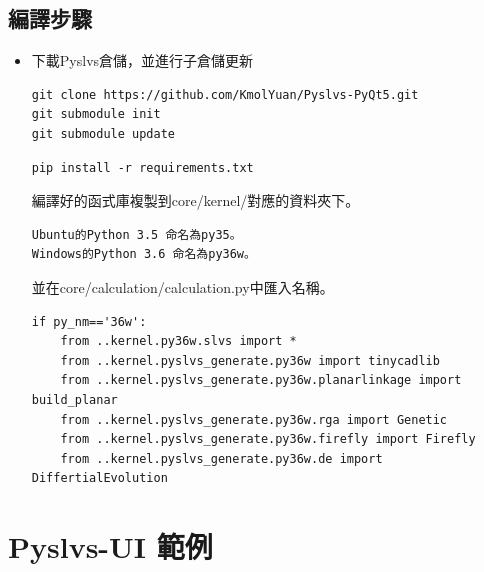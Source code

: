 \documentclass[14pt,a4paper]{report}  %
\begin{document}
{     \subsection{編譯步驟}
		\begin{itemize}
		\item 下載Pyslvs倉儲，並進行子倉儲更新
		\begin{lstlisting}[caption=下載倉儲並更新]
git clone https://github.com/KmolYuan/Pyslvs-PyQt5.git
git submodule init
git submodule update
		\end{lstlisting}
		\begin{lstlisting}[caption=安裝Python套件]
pip install -r requirements.txt
		\end{lstlisting}
		編譯好的函式庫複製到core/kernel/對應的資料夾下。
		\begin{lstlisting}[caption=複製函式庫]
Ubuntu的Python 3.5 命名為py35。
Windows的Python 3.6 命名為py36w。
		\end{lstlisting}
		並在core/calculation/calculation.py中匯入名稱。
		\begin{lstlisting}[caption=匯入名稱]
if py_nm=='36w':
    from ..kernel.py36w.slvs import *
    from ..kernel.pyslvs_generate.py36w import tinycadlib
    from ..kernel.pyslvs_generate.py36w.planarlinkage import build_planar
    from ..kernel.pyslvs_generate.py36w.rga import Genetic
    from ..kernel.pyslvs_generate.py36w.firefly import Firefly
    from ..kernel.pyslvs_generate.py36w.de import DiffertialEvolution
    \end{lstlisting}
    \end{itemize}
       

      
    
      \section{Pyslvs-UI 範例}
}
\end{document}
